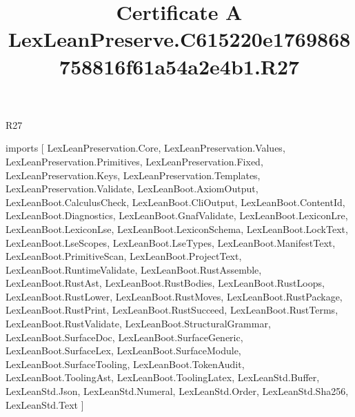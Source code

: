 \begin{lexlean}{R27}
\title{Certificate A LexLeanPreserve.C615220e1769868758816f61a54a2e4b1.R27}
\begin{coremodule}
imports [
  LexLeanPreservation.Core,
  LexLeanPreservation.Values,
  LexLeanPreservation.Primitives,
  LexLeanPreservation.Fixed,
  LexLeanPreservation.Keys,
  LexLeanPreservation.Templates,
  LexLeanPreservation.Validate,
  LexLeanBoot.AxiomOutput,
  LexLeanBoot.CalculusCheck,
  LexLeanBoot.CliOutput,
  LexLeanBoot.ContentId,
  LexLeanBoot.Diagnostics,
  LexLeanBoot.GnafValidate,
  LexLeanBoot.LexiconLre,
  LexLeanBoot.LexiconLse,
  LexLeanBoot.LexiconSchema,
  LexLeanBoot.LockText,
  LexLeanBoot.LseScopes,
  LexLeanBoot.LseTypes,
  LexLeanBoot.ManifestText,
  LexLeanBoot.PrimitiveScan,
  LexLeanBoot.ProjectText,
  LexLeanBoot.RuntimeValidate,
  LexLeanBoot.RustAssemble,
  LexLeanBoot.RustAst,
  LexLeanBoot.RustBodies,
  LexLeanBoot.RustLoops,
  LexLeanBoot.RustLower,
  LexLeanBoot.RustMoves,
  LexLeanBoot.RustPackage,
  LexLeanBoot.RustPrint,
  LexLeanBoot.RustSucceed,
  LexLeanBoot.RustTerms,
  LexLeanBoot.RustValidate,
  LexLeanBoot.StructuralGrammar,
  LexLeanBoot.SurfaceDoc,
  LexLeanBoot.SurfaceGeneric,
  LexLeanBoot.SurfaceLex,
  LexLeanBoot.SurfaceModule,
  LexLeanBoot.SurfaceTooling,
  LexLeanBoot.TokenAudit,
  LexLeanBoot.ToolingAst,
  LexLeanBoot.ToolingLatex,
  LexLeanStd.Buffer,
  LexLeanStd.Json,
  LexLeanStd.Numeral,
  LexLeanStd.Order,
  LexLeanStd.Sha256,
  LexLeanStd.Text
]


\end{coremodule}
\end{lexlean}
